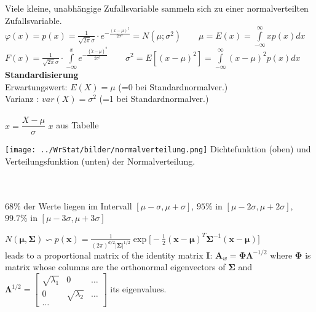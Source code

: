   \begin{minipage}{12cm}
  Viele kleine, unabhängige Zufallsvariable sammeln sich zu einer
  normalverteilten Zufallsvariable.\\
   $\varphi(x)=p(x)=\frac{1}{\sqrt{2
  \pi}\sigma}\cdot e^{-\frac{(x-\mu)^2}{2\sigma^2}} = N(\mu ; \sigma^2) \qquad \mu=E(x)=\int\limits_{-\infty}^{\infty}{x p(x) dx}$\\ 
  $F(x)=\frac{1}{\sqrt{2
  \pi}\sigma}\cdot \int\limits^{x}_{-\infty}{e^{-\frac{(\tilde{x} -\mu)^2}{2\sigma^2}}} \qquad \sigma^2=E\left[(x-\mu)^2\right]=\int\limits_{-\infty}^{\infty}{(x-\mu)^2 p(x) dx}$ \\
  \textbf{Standardisierung}\\
  Erwartungswert: $E(X)=\mu$ \hspace{4mm}(=0 bei Standardnormalver.)\\ 
  Varianz \hspace{11.5mm}: $var(X)=\sigma^2$ (=1 bei Standardnormalver.)\\ \\
  $x=\dfrac{X-\mu}{\sigma}$ \hspace{5mm} $x$ aus Tabelle
  \end{minipage}
  \begin{minipage}{7cm}
  \texttt{[image: ../WrStat/bilder/normalverteilung.png]}
  Dichtefunktion (oben) und Verteilungsfunktion (unten) der Normalverteilung. 
  \end{minipage} \\ \\ 
 $ 68\% $ der Werte liegen im Intervall $[ \mu - \sigma, \mu + \sigma]$, $95\% $ in $[ \mu - 2\sigma, \mu + 2\sigma]$, $99.7\% $ in $[ \mu - 3\sigma, \mu + 3\sigma]$



  $N(\boldsymbol{\mu}, \boldsymbol{\Sigma}) \backsim p(\mathbf{x}) = \frac{1}{(2\pi)^{d/2} | \boldsymbol{\Sigma}|^{1/2}} \exp \bigg[-\frac{1}{2} (\mathbf{x} - \boldsymbol{\mu})^T \boldsymbol{\Sigma}^{-1} (\mathbf{x}-\boldsymbol{\mu})\bigg]$
  \\
   leads to a proportional matrix of the identity matrix $\mathbf{I}$:
  $\mathbf{A}_w = \boldsymbol{\Phi} \boldsymbol{\Lambda}^{-1/2}$ 
  where $\mathbf{\Phi}$ is matrix whose columns are the orthonormal eigenvectors of 
  $\mathbf{\Sigma}$ and $\mathbf{\Lambda}^{1/2}=\begin{bmatrix}
  \sqrt{\lambda_1}& 0 & \ldots \\
  0&\sqrt{\lambda_2}&\ldots\\
  \ldots
  \end{bmatrix}$ its eigenvalues.
  
